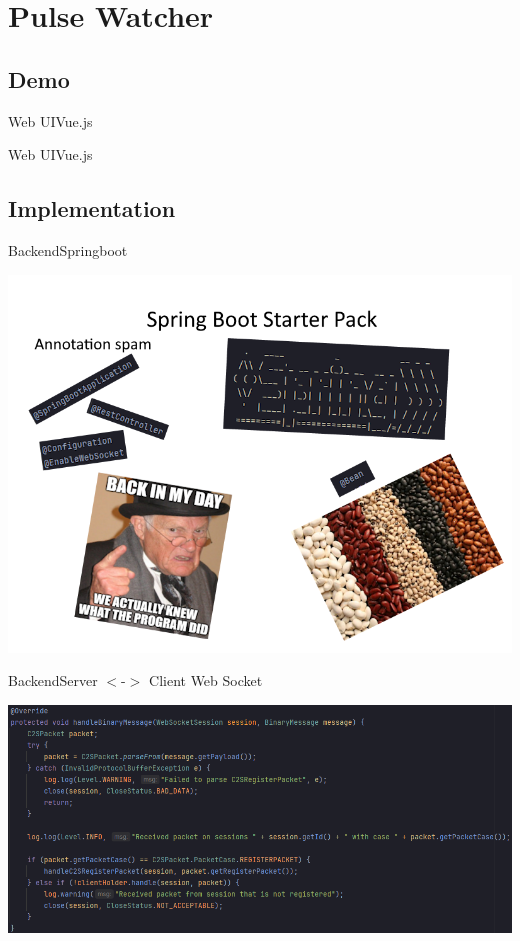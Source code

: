 \documentclass{beamer}
\begin{document}
\section{Pulse Watcher}

\subsection{Demo}

\begin{frame}{Web UI}{Vue.js}
\end{frame}

\begin{frame}{Web UI}{Vue.js}
\end{frame}

\subsection{Implementation}

\begin{frame}{Backend}{Springboot}

\includegraphics[width=\linewidth,keepaspectratio]{spring_boot_meme.png}


\end{frame}

\begin{frame}{Backend}{Server $<$-$>$ Client Web Socket}

\includegraphics[width=\linewidth,keepaspectratio]{code_snippet.png}

\end{frame}
\end{document}
